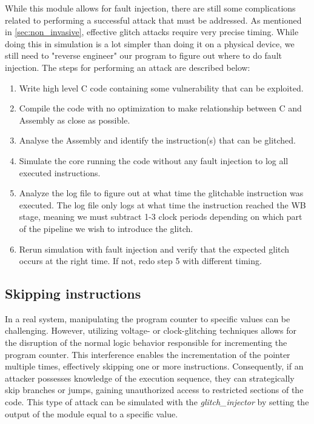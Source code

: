While this module allows for fault injection, there are still some complications related to performing a successful attack that must be addressed. As mentioned in \autoref{sec:non_invasive}, effective glitch attacks require very precise timing. While doing this in simulation is a lot simpler than doing it on a physical device, we still need to "reverse engineer" our program to figure out where to do fault injection. The steps for performing an attack are described below:

\begin{enumerate}
    \item Write high level C code containing some vulnerability that can be exploited. 
    \item Compile the code with no optimization to make relationship between C and Assembly as close as possible.
    \item Analyse the Assembly and identify the instruction(s) that can be glitched.
    \item Simulate the core running the code without any fault injection to log all executed instructions. 
    \item Analyze the log file to figure out at what time the glitchable instruction was executed. The log file only logs at what time the instruction reached the WB stage, meaning we must subtract 1-3 clock periods depending on which part of the pipeline we wish to introduce the glitch. 
    \item Rerun simulation with fault injection and verify that the expected glitch occurs at the right time. If not, redo step 5 with different timing. 
\end{enumerate}

\subsection{Skipping instructions}
\label{subsec:skip_instr}

In a real system, manipulating the program counter to specific values can be challenging. However, utilizing voltage- or clock-glitching techniques allows for the disruption of the normal logic behavior responsible for incrementing the program counter. This interference enables the incrementation of the pointer multiple times, effectively skipping one or more instructions. Consequently, if an attacker possesses knowledge of the execution sequence, they can strategically skip branches or jumps, gaining unauthorized access to restricted sections of the code. This type of attack can be simulated with the \textit{glitch\_injector} by setting the output of the module equal to a specific value. 

